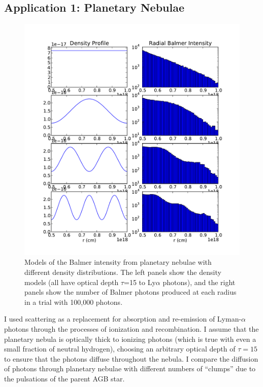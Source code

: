 \documentclass{amsart}
\begin{document}
\subsection{Application 1: Planetary Nebulae}

\begin{figure}[h]
  \begin{center}
     \includegraphics[width=\textwidth]{pn}
  \end{center}
  \caption{Models of the Balmer intensity from planetary nebulae with different density distributions.  The left panels show the density models (all have optical depth $\tau$=15 to Ly$\alpha$ photons), and the right
panels show the number of Balmer photons produced at each radius in a trial with 100,000 photons.}
\label{fig:pn}
\end{figure}

I used scattering as a replacement for absorption and re-emission of
Lyman-$\alpha$ photons through the processes of ionization and recombination.  I assume that the planetary nebula is optically thick to ionizing photons (which is true with even a small fraction of neutral hydrogen), choosing an arbitrary optical depth of $\tau=15$ to ensure that the photons diffuse throughout the nebula.  I compare the diffusion of photons through planetary nebulae with different numbers of ``clumps'' due to the pulsations of the parent AGB star.
\end{document}
